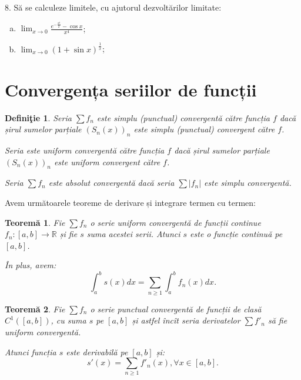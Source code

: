 \documentclass[11pt,a4paper]{article}
\newcommand\ds{\displaystyle}
\newcommand\RR{\mathbb{R}}
\theoremstyle{dotless}
\newtheorem{theorem}{Teorem\u{a}}[section]
\theoremstyle{dotlessdr}
\newtheorem{definition}{Defini\c{t}ie}[section]
\begin{document}
\vspace{1cm}

8. Să se calculeze limitele, cu ajutorul dezvoltărilor limitate:
\begin{enumerate}[(a)]
\item $\ds\lim_{x \to 0} \frac{e^{-\frac{x^2}{2}} - \cos x}{x^4}$;
\item $\ds\lim_{x \to 0} (1 + \sin x)^{\frac{1}{x}}$;
\end{enumerate}
\vspace{1cm}



\section{Convergența seriilor de funcții}
\label{sec:serii-f}

\begin{definition}\label{def:pc-sf}
  Seria $\sum f_n$ este \emph{simplu (punctual) convergentă către funcția $f$} dacă șirul
  sumelor parțiale $(S_n(x))_n$ este simplu (punctual) convergent către $f$.

  Seria este \emph{uniform convergentă către funcția $f$} dacă șirul sumelor parțiale
  $(S_n(x))_n$ este uniform convergent către $f$.

  Seria $\sum f_n$ este \emph{absolut convergentă} dacă seria $\sum |f_n|$ este
  simplu convergentă.
\end{definition}

Avem următoarele teoreme de derivare și integrare termen cu termen:

\begin{theorem}\label{thm:int-t}
  Fie $\sum f_n$ o serie uniform convergentă de funcții continue $f_n : [a, b] \to \RR$
  și fie $s$ suma acestei serii. Atunci $s$ este o funcție continuă pe $[a, b]$.

  În plus, avem:
  \[
    \int_a^b s(x) dx = \sum_{n \geq 1} \int_a^b f_n(x) dx.
  \]
\end{theorem}

\begin{theorem}\label{thm:der-t}
  Fie $\sum f_n$ o serie punctual convergentă de funcții de clasă $C^1([a, b])$, cu suma
  $s$ pe $[a, b]$ și astfel încît seria derivatelor $\sum f'_n$ să fie uniform convergentă.

  Atunci funcția $s$ este derivabilă pe $[a, b]$ și:
  \[
    s'(x) = \sum_{n \geq 1} f'_n(x), \forall x \in [a, b].
  \]
\end{theorem}
\end{document}
